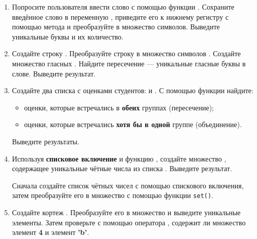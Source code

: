 \documentclass[a4,12pt]{article}
\theoremstyle{remark}
\begin{document}
\begin{enumerate}[resume]

    \item Попросите пользователя ввести слово с помощью функции {}. Сохраните введённое слово в переменную {}, приведите его к нижнему регистру с помощью метода {} и преобразуйте в множество символов. Выведите уникальные буквы и их количество.

    \item Создайте строку {}. Преобразуйте строку в множество символов {}. Создайте множество гласных {}. Найдите пересечение --- уникальные гласные буквы в слове. Выведите результат.

    \item Создайте два списка с оценками студентов: {} и {}. С помощью функции {} найдите:
    \begin{itemize}
        \item оценки, которые встречались в \textbf{обеих} группах (пересечение);
        \item оценки, которые встречались \textbf{хотя бы в одной} группе (объединение).
    \end{itemize}
    Выведите результаты.

    \item Используя \textbf{списковое включение} и функцию {}, создайте множество {}, содержащее уникальные чётные числа из списка {\color{blue}{\texttt{[1, 2, 3, 4, 4, 6, 6, 8, 8, 10, 2]}}}. Выведите результат.

    \begin{exercisecomment}
    Сначала создайте список чётных чисел с помощью спискового включения,
    затем преобразуйте его в множество с помощью функции \texttt{set()}.
    \end{exercisecomment}

    \item Создайте кортеж {}. Преобразуйте его в множество и выведите уникальные элементы. Затем проверьте с помощью оператора {}, содержит ли множество элемент \textbf{4} и элемент \textbf{'b'}.

\end{enumerate}
\end{document}
